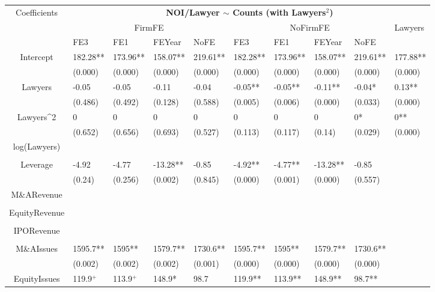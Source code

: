 \documentclass{article}
\begin{document}
\begin{table}[H]
\centering
\begin{tabular}{|clllllllll|}
\hline
\multirow{3}{*}{Coefficients} & \multicolumn{9}{c|}{\textbf{NOI/Lawyer $\sim$ Counts (with Lawyers$^2$)}} \\
\cline{2-10}
& \multicolumn{4}{c}{FirmFE} & \multicolumn{4}{c}{NoFirmFE} & \multirow{2}{*}{Lawyers} \\
\cline{2-9}
& FE3 & FE1 & FEYear & NoFE & FE3 & FE1 & FEYear & NoFE &  \\
\hline
 
Intercept & 182.28** & 173.96** & 158.07** & 219.61** & 182.28** & 173.96** & 158.07** & 219.61** & 177.88** \\ 
   & (0.000) & (0.000) & (0.000) & (0.000) & (0.000) & (0.000) & (0.000) & (0.000) & (0.000) \\ 
  Lawyers & -0.05 & -0.05 & -0.11 & -0.04 & -0.05** & -0.05** & -0.11** & -0.04* & 0.13** \\ 
   & (0.486) & (0.492) & (0.128) & (0.588) & (0.005) & (0.006) & (0.000) & (0.033) & (0.000) \\ 
  Lawyers^2 & 0 & 0 & 0 & 0 & 0 & 0 & 0 & 0* & 0** \\ 
   & (0.652) & (0.656) & (0.693) & (0.527) & (0.113) & (0.117) & (0.14) & (0.029) & (0.000) \\ 
  log(Lawyers) &  &  &  &  &  &  &  &  &  \\ 
   &  &  &  &  &  &  &  &  &  \\ 
  Leverage & -4.92 & -4.77 & -13.28** & -0.85 & -4.92** & -4.77** & -13.28** & -0.85 &  \\ 
   & (0.24) & (0.256) & (0.002) & (0.845) & (0.000) & (0.001) & (0.000) & (0.557) &  \\ 
  M\&ARevenue &  &  &  &  &  &  &  &  &  \\ 
   &  &  &  &  &  &  &  &  &  \\ 
  EquityRevenue &  &  &  &  &  &  &  &  &  \\ 
   &  &  &  &  &  &  &  &  &  \\ 
  IPORevenue &  &  &  &  &  &  &  &  &  \\ 
   &  &  &  &  &  &  &  &  &  \\ 
  M\&AIssues & 1595.7** & 1595** & 1579.7** & 1730.6** & 1595.7** & 1595** & 1579.7** & 1730.6** &  \\ 
   & (0.002) & (0.002) & (0.002) & (0.001) & (0.000) & (0.000) & (0.000) & (0.000) &  \\ 
  EquityIssues & 119.9$^{+}$ & 113.9$^{+}$ & 148.9* & 98.7 & 119.9** & 113.9** & 148.9** & 98.7** &  \\ 

\end{tabular}
\end{table}
\end{document}

